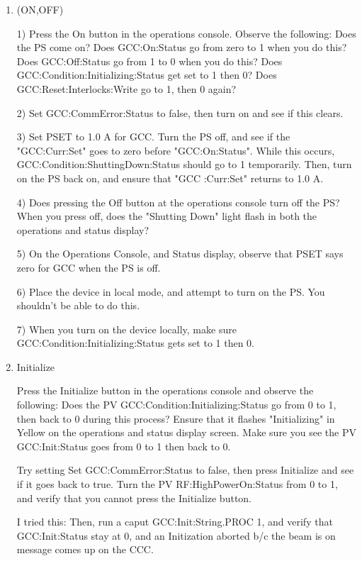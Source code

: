 \documentclass[11pt]{book}		%
\begin{document}
\begin{enumerate}

 \item (ON,OFF)

\color{red}
1) Press the On button in the operations console. Observe the following: 
	Does the PS come on? 
	Does GCC:On:Status go from zero to 1 when you do this? 
	Does GCC:Off:Status go from 1 to 0 when you do this? 
	Does GCC:Condition:Initializing:Status get set to 1 then 0?
	Does GCC:Reset:Interlocks:Write go to 1, then 0 again?

2) Set GCC:CommError:Status to false, then turn on and see if this clears.

3) Set PSET to 1.0 A for GCC. Turn the PS off, and see if the "GCC:Curr:Set" goes to zero before "GCC:On:Status". While this occurs, GCC:Condition:ShuttingDown:Status should go to 1 temporarily. Then, turn on the PS back on, and ensure that "GCC
:Curr:Set" returns to 1.0 A.

4) Does pressing the Off button at the operations console turn off the PS? When you press off, does the "Shutting Down" light flash in both the operations and status display?

5) On the Operations Console, and Status display, observe that PSET says zero for GCC when the PS is off.

6) Place the device in local mode, and attempt to turn on the PS. You shouldn't be able to do this.

7) When you turn on the device locally, make sure GCC:Condition:Initializing:Status gets set to 1 then 0.


\color{black}

 \item Initialize

\color{red}

Press the Initialize button in the operations console and observe the following: 
	Does the PV GCC:Condition:Initializing:Status go from 0 to 1, then back to 0 during this process? 
	Ensure that it flashes "Initializing" in Yellow on the operations and status display screen. 
	Make sure you see the PV GCC:Init:Status goes from 0 to 1 then back to 0.

Try setting Set GCC:CommError:Status to false, then press Initialize and see if it goes back to true.
Turn the PV RF:HighPowerOn:Status from 0 to 1, and verify that you cannot press the Initialize button. 

I tried this: Then, run a caput GCC:Init:String.PROC 1, and verify that GCC:Init:Status stay at 0, and an Initization aborted b/c the beam is on message comes up on the CCC.


\end{enumerate}
\end{document}
